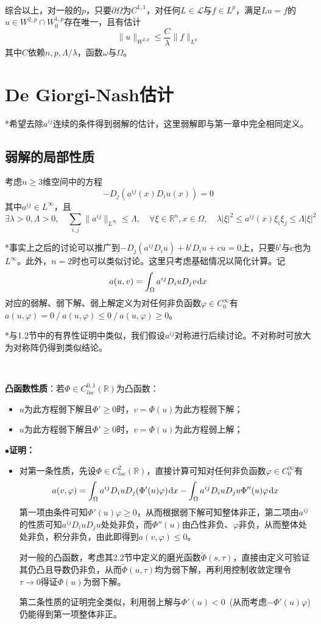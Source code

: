 \documentclass[a4paper,UTF8,fontset=windows,AutoFakeBold]{ctexart}
\newcommand*{\dr}{\hspace{0.07em}\mathrm{d}}
\newcommand{\proo}[1]{{\kaishu $\bullet$\textbf{证明：}
\begin{itemize}
    \item[] #1
\end{itemize}
}}
\begin{document}
\

综合以上，对一般的$p$，只要$\partial\Omega$为$C^{1,1}$，对任何$L\in\mathcal{L}$与$f\in L^p$，满足$Lu=f$的$u\in W^{2,p}\cap W_0^{1,p}$存在唯一，且有估计
$$\|u\|_{W^{2,p}}\le\frac{C}{\lambda}\|f\|_{L^p}$$
其中$C$依赖$n,p,\Lambda/\lambda$，函数$\omega$与$\Omega$。


\section{De Giorgi-Nash估计}
*希望去除$a^{ij}$连续的条件得到弱解的估计，这里弱解即与第一章中完全相同定义。

\subsection{弱解的局部性质}
考虑$n\ge3$维空间中的方程
$$-D_j(a^{ij}(x)D_iu(x))=0$$
其中$a^{ij}\in L^\infty$，且
$$\exists\lambda>0,\Lambda>0,\quad\sum_{i,j}\|a^{ij}\|_{L^\infty}\le\Lambda,\quad\forall\xi\in\mathbb{R}^n,x\in\Omega,\quad\lambda|\xi|^2\le a^{ij}(x)\xi_i\xi_j\le\Lambda|\xi|^2$$

*事实上之后的讨论可以推广到$-D_j(a^{ij}D_iu)+b^iD_iu+cu=0$上，只要$b^i$与$c$也为$L^\infty$。此外，$n=2$时也可以类似讨论。这里只考虑基础情况以简化计算。记
$$a(u,v)=\int_\Omega a^{ij}D_iuD_jv\dr x$$
对应的弱解、弱下解、弱上解定义为对任何非负函数$\varphi\in C_0^\infty$有$a(u,\varphi)=0\ /\ a(u,\varphi)\le0\ /\ a(u,\varphi)\ge0$。

*与1.2节中的有界性证明中类似，我们假设$a^{ij}$对称进行后续讨论。不对称时可放大为对称阵仍得到类似结论。

\

\textbf{凸函数性质}：若$\Phi\in C_{loc}^{0,1}(\mathbb{R})$为凸函数：
\begin{itemize}
    \item $u$为此方程弱下解且$\Phi'\ge0$时，$v=\Phi(u)$为此方程弱下解；
    \item $u$为此方程弱下解且$\Phi'\ge0$时，$v=\Phi(u)$为此方程弱上解；
\end{itemize}
\proo{
    对第一条性质，先设$\Phi\in C_{loc}^2(\mathbb{R})$，直接计算可知对任何非负函数$\varphi\in C_0^\infty$有
    $$a(v,\varphi)=\int_\Omega a^{ij}D_iuD_j(\Phi'(u)\varphi)\dr x-\int_\Omega a^{ij}D_iuD_ju\Phi''(u)\varphi\dr x$$
    第一项由条件可知$\Phi'(u)\varphi\ge0$，从而根据弱下解可知整体非正，第二项由$a^{ij}$的性质可知$a^{ij}D_iuD_ju$处处非负，而$\Phi''(u)$由凸性非负、$\varphi$非负，从而整体处处非负，积分非负，由此即得到$a(v,\varphi)\le0$。

    对一般的凸函数，考虑其2.2节中定义的磨光函数$\tilde{\Phi}(s,\tau)$，直接由定义可验证其仍凸且导数仍非负，从而$\tilde{\Phi}(u,\tau)$均为弱下解，再利用控制收敛定理令$\tau\to0$得证$\Phi(u)$为弱下解。

    第二条性质的证明完全类似，利用弱上解与$\Phi'(u)<0$\ (从而考虑$-\Phi'(u)\varphi$)仍能得到第一项整体非正。
}
\end{document}
